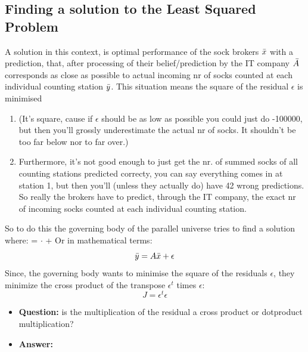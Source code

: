 \subsection{Finding a solution to the Least Squared Problem}
A solution in this context, is optimal performance of the sock brokers $\Bar{x}$ with a prediction, that, after processing of their belief/prediction by the IT company $\Bar{A}$ corresponds as close as possible to actual incoming nr of socks counted at each individual counting station $\Bar{y}$. This situation means the square of the residual $\epsilon$ is minimised
\begin{enumerate}
    \item (It's square, cause if $\epsilon$ should be as low as possible you could just do -100000, but then you'll grossly underestimate the actual nr of socks. It shouldn't be too far below nor to far over.)
    \item Furthermore, it's not good enough to just get the nr. of summed socks of all counting stations predicted correcty, you can say everything comes in at station 1, but then you'll (unless they actually do) have 42 wrong predictions. So really the brokers have to predict, through the IT company, the exact nr of incoming socks counted at each individual counting station.
\end{enumerate}
So to do this the governing body of the parallel universe tries to find a solution where:
\newline
{}\newline
= \newline
{}\newline 
$\cdot$
\newline 
{}
\newline
+
\newline
{}
\newline
\newline
Or in mathematical terms:
\begin{equation}
\Bar{y}=A\Bar{x}+\epsilon
\label{eq:observations_vs_parameter}
\end{equation}
Since, the governing body wants to minimise the square of the residuals $\epsilon$, they minimize the cross product of the transpose $\epsilon^t$ times $\epsilon$:
\begin{equation}
    J=\epsilon^t\epsilon
    \label{eq:squared_error}
\end{equation}  
\begin{itemize}
    \item \textbf{Question:} is the multiplication of the residual a cross product or dotproduct multiplication?
    \item \textbf{Answer:}
\end{itemize}

